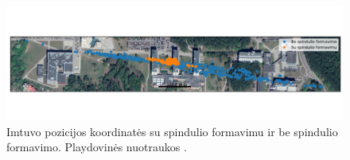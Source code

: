 \documentclass[main.tex]{subfiles}
\begin{document}
\begin{figure}[ht]
    \begin{centering}
    \includegraphics[scale=0.5]{drawings/two_reflections_map}
    \par\end{centering}
    \protect\caption{\label{fig:two_reflection_map}Imtuvo pozicijos koordinatės su spindulio formavimu ir be spindulio formavimo. Playdovinės nuotraukos \cite{google_maps}.}
\end{figure}
\end{document}
